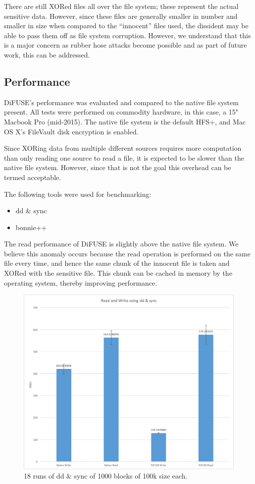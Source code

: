 \documentclass[10pt,twocolumn]{article}
\begin{document}
There are still XORed files all over the file system; these represent the actual sensitive data. However, since these files are generally smaller in number and smaller in size when compared to the ``innocent'' files used, the dissident may be able to pass them off as file system corruption. However, we understand that this is a major concern as rubber hose attacks become possible \cite{rubberhose} and as part of future work, this can be addressed. 

\subsection{Performance}

DiFUSE's performance was evaluated and compared to the native file system present. All tests were performed on commodity hardware, in this case, a 15" Macbook Pro (mid-2015). The native file system is the default HFS+, and Mac OS X's FileVault disk encryption is enabled. 

Since XORing data from multiple different sources requires more computation than only reading one source to read a file, it is expected to be slower than the native file system. However, since that is not the goal this overhead can be termed acceptable. 

The following tools were used for benchmarking: 
\begin{itemize}
\item dd \& sync
\item bonnie++
\end{itemize}

The read performance of DiFUSE is slightly above the native file system. We believe this anomaly occurs because the read operation is performed on the same file every time, and hence the same chunk of the innocent file is taken and XORed with the sensitive file. This chunk can be cached in memory by the operating system, thereby improving performance. 
\begin{figure}[thpb]
  \centering
  	\includegraphics[width=\columnwidth]{dd}
    \caption{18 runs of dd \& sync of 1000 blocks of 100k size each. }
	\label{fig:dd}
\end{figure}
\end{document}
